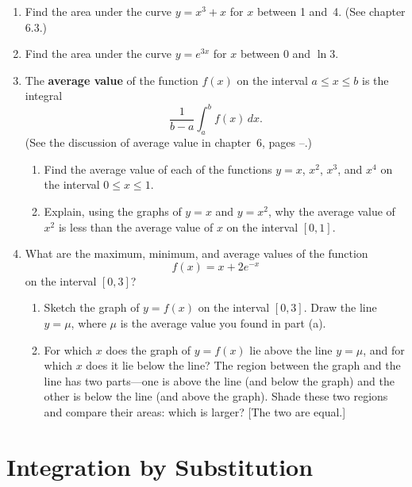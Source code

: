 \begin{enumerate}
\begin{enumerate}
\end{enumerate}
\item Find the area under the curve $y = x^3 + x$ for $x$ between 1
and~4.  (See chapter 6.3.)


\item Find the area under the curve $y = e^{3x}$ for $x$ between 0 and
$\ln{3}$.


\item The {\bf average value} of the function $f(x)$ on the interval $a
\leq x \leq b$ is the integral
\[
\dfrac{1}{b-a} \int_a^b f(x) \, dx.
\]
(See the discussion of average value in chapter~6, pages
\pageref{average-begin}--\pageref{average-end}.)


  \begin{enumerate}
  \item Find the average value of each of the functions $y = x$, $x^2$,
$x^3$, and $x^4$ on the interval $0 \leq x \leq 1$.

  \item Explain, using the graphs of $y = x$ and $y = x^2$, why the
average value of $x^2$ is less than the average value of $x$ on the
interval $[0, 1]$.


\end{enumerate}
\item What are the maximum, minimum, and average values of the function
	\[
f(x) = x + 2 e^{-x}
\]
on the interval $[0, 3]$?

  \begin{enumerate}
  \item Sketch the graph of $y = f(x)$ on the interval $[0, 3]$.  Draw
the line $y = \mu$, where $\mu$ is the average value you found in part
(a).

  \item For which $x$ does the graph of $y = f(x)$ lie above the line $y
= \mu$, and for which $x$ does it lie below the line?  The region
between the graph and the line has two parts---one is above the line
(and below the graph) and the other is below the line (and above the
graph).  Shade these two regions and compare their areas: which is
larger?  \hfill [The two are equal.]




\end{enumerate}
\end{enumerate}
\section{Integration by Substitution}
\label{sec:integration-by-substitution}

